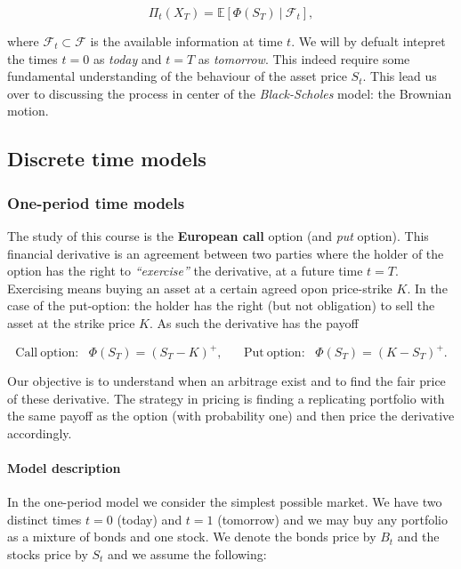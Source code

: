 \documentclass[
]{article}
\begin{document}
\[\Pi_t(X_T)=\mathbb{E}\left[\Phi(S_T)\ \vert\ \mathcal{F}_t\right],\]

where \(\mathcal{F}_t\subset\mathcal{F}\) is the available information
at time \(t\). We will by defualt intepret the times \(t=0\) as
\emph{today} and \(t=T\) as \emph{tomorrow}. This indeed require some
fundamental understanding of the behaviour of the asset price \(S_t\).
This lead us over to discussing the process in center of the
\emph{Black-Scholes} model: the Brownian motion.

\hypertarget{discrete-time-models}{%
\subsection{Discrete time models}\label{discrete-time-models}}

\hypertarget{one-period-time-models}{%
\subsubsection{One-period time models}\label{one-period-time-models}}

The study of this course is the \textbf{European call} option (and
\emph{put} option). This financial derivative is an agreement between
two parties where the holder of the option has the right to
\emph{``exercise''} the derivative, at a future time \(t=T\). Exercising
means buying an asset at a certain agreed opon price-strike \(K\). In
the case of the put-option: the holder has the right (but not
obligation) to sell the asset at the strike price \(K\). As such the
derivative has the payoff

\[\text{Call}\ \text{option:}\hspace{10pt}\Phi(S_T)=(S_T-K)^+,\hspace{20pt}\text{Put}\ \text{option:}\hspace{10pt}\Phi(S_T)=(K-S_T)^+.\]

Our objective is to understand when an arbitrage exist and to find the
fair price of these derivative. The strategy in pricing is finding a
replicating portfolio with the same payoff as the option (with
probability one) and then price the derivative accordingly.

\hypertarget{model-description}{%
\paragraph{Model description}\label{model-description}}

In the one-period model we consider the simplest possible market. We
have two distinct times \(t=0\) (today) and \(t=1\) (tomorrow) and we
may buy any portfolio as a mixture of bonds and one stock. We denote the
bonds price by \(B_t\) and the stocks price by \(S_t\) and we assume the
following:
\end{document}
